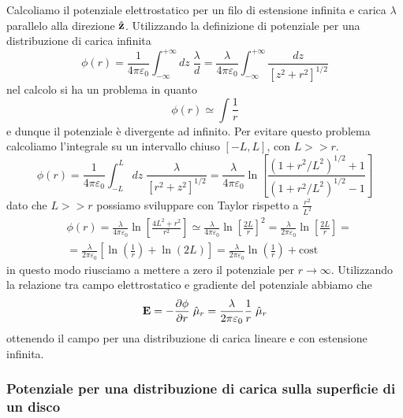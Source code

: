 Calcoliamo il potenziale elettrostatico per un filo di estensione infinita e carica $\lambda $ parallelo alla direzione $\hat{\bold{z}}$. Utilizzando la definizione di potenziale per una distribuzione di carica infinita 
\begin{equation*}
	\phi(r) = \frac{1}{4 \pi \varepsilon_0} \int_{-\infty}^{+\infty} dz \; \frac{\lambda}{d} = \frac{\lambda }{4 \pi \varepsilon_0} \int_{-\infty}^{+\infty} \frac{dz}{[z^2+r^2]^{1/2}}
\end{equation*}
nel calcolo si ha un problema in quanto 
\begin{equation*}
	\phi(r) \simeq \int \frac{1}{r}
\end{equation*}
e dunque il potenziale \`e divergente ad infinito. Per evitare questo problema calcoliamo l'integrale su un intervallo chiuso $[-L,L]$, con $L >> r$.
\begin{equation*}
	\phi(r) = \frac{1}{4 \pi \varepsilon_0} \int_{-L}^{L}dz \; \frac{\lambda}{[r^2+z^2]^{1/2}} = \frac{\lambda}{4 \pi \varepsilon_0} \ln \left[ \frac{(1+  r^2/L^2)^{1/2}+1}{(1+r^2/L^2)^{1/2} -1}\right ]
\end{equation*}
dato che $L >> r$ possiamo sviluppare con Taylor rispetto a $\frac{r^2}{L^2}$
\begin{equation*}
	\begin{aligned}
		& \phi(r) = \frac{\lambda}{4 \pi \varepsilon_0} \ln \left [ \frac{4L^2+r^2}{r^2} \right ] \simeq \frac{\lambda}{4 \pi \varepsilon_0} \ln \left[\frac{2L}{r} \right ]^2 = \frac{\lambda}{2 \pi \varepsilon_0} \ln \left[\frac{2L}{r}\right ] = \\[0.5cm]
		& = \frac{\lambda}{2 \pi \varepsilon_0} \left [ \ln \left ( \frac{1}{r} \right ) + \ln(2L)\right] = \frac{\lambda}{2 \pi \varepsilon_0} \ln \left ( \frac{1}{r} \right) + \text{cost} 
	\end{aligned}
\end{equation*}
in questo modo riusciamo a mettere a zero il potenziale per $r \to \infty$.
Utilizzando la relazione tra campo elettrostatico e gradiente del potenziale abbiamo che 
\begin{equation*}
	\bold{E} = - \frac{\partial \phi}{\partial r} \; \hat{\mu}_{r} = \frac{\lambda}{2 \pi \varepsilon_0} \frac{1}{r} \;\hat{\mu}_{r}
\end{equation*}
ottenendo il campo per una distribuzione di carica lineare e con estensione infinita.
\newpage

\subsubsection{Potenziale per una distribuzione di carica sulla superficie di un disco}

